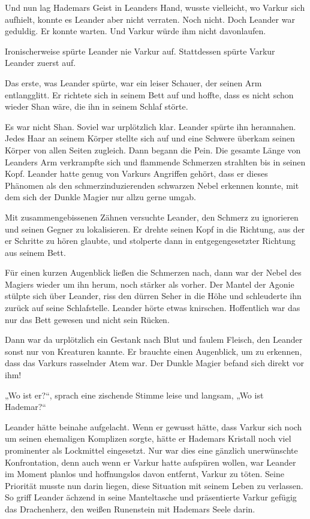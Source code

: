 Und nun lag Hademars Geist in Leanders Hand, wusste vielleicht, wo Varkur sich aufhielt, konnte es Leander aber nicht verraten. Noch nicht. Doch Leander war geduldig. Er konnte warten. Und Varkur würde ihm nicht davonlaufen.



\trennzeichen



Ironischerweise spürte Leander nie Varkur auf. Stattdessen spürte Varkur Leander zuerst auf.

Das erste, was Leander spürte, war ein leiser Schauer, der seinen Arm entlangglitt. Er richtete sich in seinem Bett auf und hoffte, dass es nicht schon wieder Shan wäre, die ihn in seinem Schlaf störte.

Es war nicht Shan. Soviel war urplötzlich klar. Leander spürte ihn herannahen. Jedes Haar an seinem Körper stellte sich auf und eine Schwere überkam seinen Körper von allen Seiten zugleich. Dann begann die Pein. Die gesamte Länge von Leanders Arm verkrampfte sich und flammende Schmerzen strahlten bis in seinen Kopf. Leander hatte genug von Varkurs Angriffen gehört, dass er dieses Phänomen als den schmerzinduzierenden schwarzen Nebel erkennen konnte, mit dem sich der Dunkle Magier nur allzu gerne umgab.

Mit zusammengebissenen Zähnen versuchte Leander, den Schmerz zu ignorieren und seinen Gegner zu lokalisieren. Er drehte seinen Kopf in die Richtung, aus der er Schritte zu hören glaubte, und stolperte dann in entgegengesetzter Richtung aus seinem Bett.

Für einen kurzen Augenblick ließen die Schmerzen nach, dann war der Nebel des Magiers wieder um ihn herum, noch stärker als vorher. Der Mantel der Agonie stülpte sich über Leander, riss den dürren Seher in die Höhe und schleuderte ihn zurück auf seine Schlafstelle. Leander hörte etwas knirschen. Hoffentlich war das nur das Bett gewesen und nicht sein Rücken.

Dann war da urplötzlich ein Gestank nach Blut und faulem Fleisch, den Leander sonst nur von Kreaturen kannte. Er brauchte einen Augenblick, um zu erkennen, dass das Varkurs rasselnder Atem war. Der Dunkle Magier befand sich direkt vor ihm!

„Wo ist er?“, sprach eine zischende Stimme leise und langsam, „Wo ist Hademar?“

Leander hätte beinahe aufgelacht. Wenn er gewusst hätte, dass Varkur sich noch um seinen ehemaligen Komplizen sorgte, hätte er Hademars Kristall noch viel prominenter als Lockmittel eingesetzt. Nur war dies eine gänzlich unerwünschte Konfrontation, denn auch wenn er Varkur hatte aufspüren wollen, war Leander im Moment planlos und hoffnungslos davon entfernt, Varkur zu töten. Seine Priorität musste nun darin liegen, diese Situation mit seinem Leben zu verlassen. So griff Leander ächzend in seine Manteltasche und präsentierte Varkur gefügig das Drachenherz, den weißen Runenstein mit Hademars Seele darin.

